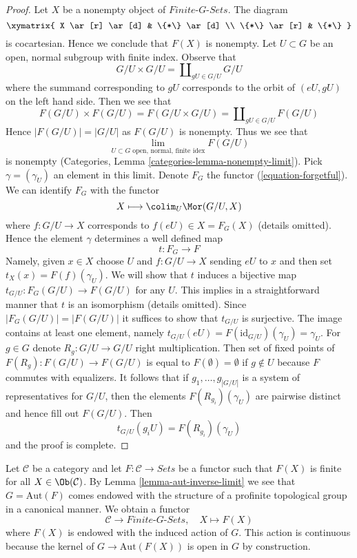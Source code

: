 \begin{proof}
Let $X$ be a nonempty object of $\textit{Finite-}G\textit{-Sets}$.
The diagram
$$
\xymatrix{
X \ar[r] \ar[d] & \{*\} \ar[d] \\
\{*\} \ar[r] & \{*\}
}
$$
is cocartesian. Hence we conclude that $F(X)$ is nonempty.
Let $U \subset G$ be an open, normal subgroup with finite index.
Observe that
$$
G/U \times G/U = \coprod\nolimits_{gU \in G/U} G/U
$$
where the summand corresponding to $gU$ corresponds to the orbit of
$(eU, gU)$ on the left hand side. Then we see that
$$
F(G/U) \times F(G/U) = F(G/U \times G/U) = \coprod\nolimits_{gU \in G/U} F(G/U)
$$
Hence $|F(G/U)| = |G/U|$ as $F(G/U)$ is nonempty. Thus we see that
$$
\lim_{U \subset G\text{ open, normal, finite idex}} F(G/U)
$$
is nonempty (Categories, Lemma \ref{categories-lemma-nonempty-limit}).
Pick $\gamma = (\gamma_U)$ an element in this limit.
Denote $F_G$ the functor (\ref{equation-forgetful}). We can identify
$F_G$ with the functor
$$
X \longmapsto \colim_U \Mor(G/U, X)
$$
where $f : G/U \to X$ corresponds to $f(eU) \in X = F_G(X)$
(details omitted). Hence the element $\gamma$ determines
a well defined map
$$
t : F_G \longrightarrow F
$$
Namely, given $x \in X$ choose $U$ and $f : G/U \to X$ sending
$eU$ to $x$ and then set $t_X(x) = F(f)(\gamma_U)$.
We will show that $t$ induces a bijective map
$t_{G/U} : F_G(G/U) \to F(G/U)$ for any $U$.
This implies in a straightforward manner that $t$
is an isomorphism (details omitted).
Since $|F_G(G/U)| = |F(G/U)|$ it suffices to show
that $t_{G/U}$ is surjective. The image contains at least
one element, namely
$t_{G/U}(eU) = F(\text{id}_{G/U})(\gamma_U) = \gamma_U$.
For $g \in G$ denote $R_g : G/U \to G/U$ right multiplication.
Then set of fixed points of $F(R_g) : F(G/U) \to F(G/U)$
is equal to $F(\emptyset) = \emptyset$ if $g \not \in U$ because $F$
commutes with equalizers. It follows that if
$g_1, \ldots, g_{|G/U|}$ is a system of representatives
for $G/U$, then the elements $F(R_{g_i})(\gamma_U)$ are pairwise distinct
and hence fill out $F(G/U)$. Then
$$
t_{G/U}(g_iU) = F(R_{g_i})(\gamma_U)
$$
and the proof is complete.
\end{proof}

\begin{example}
\label{example-from-C-F-to-G-sets}
Let $\mathcal{C}$ be a category and let $F : \mathcal{C} \to \textit{Sets}$
be a functor such that $F(X)$ is finite for all $X \in \Ob(\mathcal{C})$.
By Lemma \ref{lemma-aut-inverse-limit} we see that $G = \text{Aut}(F)$
comes endowed with the structure of a profinite topological group in a
canonical manner. We obtain a functor
\begin{equation}
\label{equation-remember}
\mathcal{C} \longrightarrow \textit{Finite-}G\textit{-Sets},\quad
X \longmapsto F(X)
\end{equation}
where $F(X)$ is endowed with the induced action of $G$. This action
is continuous because the kernel of $G \to \text{Aut}(F(X))$ is
open in $G$ by construction.
\end{example}

